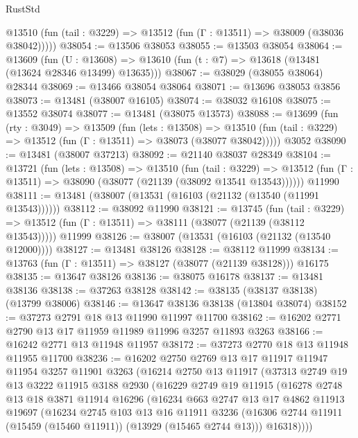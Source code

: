 \begin{lexlean}{RustStd}
\begin{coremodule}
      @13510 (fun (tail : @3229) => @13512 (fun (Γ : @13511) => @38009 (@38036 @38042)))))
@38054 := @13506 @38053
@38055 := @13503 @38054
@38064 := @13609
    (fun (U : @13608) => @13610 (fun (t : @7) => @13618 (@13481 (@13624 @28346 @13499) @13635)))
@38067 := @38029 (@38055 @38064) @28344
@38069 := @13466 @38054 @38064
@38071 := @13696 @38053 @3856
@38073 := @13481 (@38007 @16105)
@38074 := @38032 @16108
@38075 := @13552 @38074
@38077 := @13481 (@38075 @13573)
@38088 := @13699
    (fun (rty : @3049) =>
    @13509
      (fun (lets : @13508) =>
      @13510 (fun (tail : @3229) => @13512 (fun (Γ : @13511) => @38073 (@38077 @38042)))))
    @3052
@38090 := @13481 (@38007 @37213)
@38092 := @21140 @38037 @28349
@38104 := @13721
    (fun (lets : @13508) =>
    @13510
      (fun (tail : @3229) =>
      @13512 (fun (Γ : @13511) => @38090 (@38077 (@21139 (@38092 @13541 @13543))))))
    @11990
@38111 := @13481 (@38007 (@13531 (@16103 (@21132 (@13540 (@11991 @13543))))))
@38112 := @38092 @11990
@38121 := @13745
    (fun (tail : @3229) => @13512 (fun (Γ : @13511) => @38111 (@38077 (@21139 (@38112 @13543)))))
    @11999
@38126 := @38007 (@13531 (@16103 (@21132 (@13540 @12000))))
@38127 := @13481 @38126
@38128 := @38112 @11999
@38134 := @13763 (fun (Γ : @13511) => @38127 (@38077 (@21139 @38128))) @16175
@38135 := @13647 @38126
@38136 := @38075 @16178
@38137 := @13481 @38136
@38138 := @37263 @38128
@38142 := @38135 (@38137 @38138) (@13799 @38006)
@38146 := @13647 @38136 @38138 (@13804 @38074)
@38152 := @37273 @2791 @18 @13 @11990 @11997 @11700
@38162 := @16202 @2771 @2790 @13 @17 @11959 @11989 @11996 @3257 @11893 @3263
@38166 := @16242 @2771 @13 @11948 @11957
@38172 := @37273 @2770 @18 @13 @11948 @11955 @11700
@38236 := @16202
    @2750
    @2769
    @13
    @17
    @11917
    @11947
    @11954
    @3257
    @11901
    @3263
    (@16214
      @2750
      @13
      @11917
      (@37313
        @2749
        @19
        @13
        @3222
        @11915
        @3188
        @2930
        (@16229
          @2749
          @19
          @11915
          (@16278
            @2748
            @13
            @18
            @3871
            @11914
            @16296
            (@16234
              @663
              @2747
              @13
              @17
              @4862
              @11913
              @19697
              (@16234
                @2745
                @103
                @13
                @16
                @11911
                @3236
                (@16306 @2744 @11911 (@15459 (@15460 @11911)) (@13929 (@15465 @2744 @13)))
                @16318))))

\end{coremodule}
\end{lexlean}
